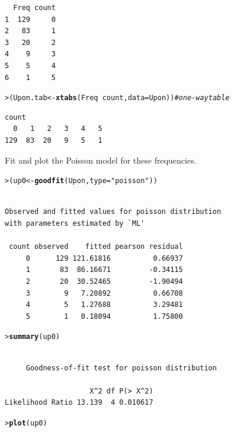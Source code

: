 \documentclass[10pt]{report}\usepackage[]{graphicx}\usepackage[]{color}
\makeatletter
\newcommand{\hlstr}[1]{\textcolor[rgb]{0.192,0.494,0.8}{#1}}%
\newcommand{\hlcom}[1]{\textcolor[rgb]{0.678,0.584,0.686}{\textit{#1}}}%
\newcommand{\hlopt}[1]{\textcolor[rgb]{0,0,0}{#1}}%
\newcommand{\hlstd}[1]{\textcolor[rgb]{0.345,0.345,0.345}{#1}}%
\newcommand{\hlkwb}[1]{\textcolor[rgb]{0.69,0.353,0.396}{#1}}%
\newcommand{\hlkwc}[1]{\textcolor[rgb]{0.333,0.667,0.333}{#1}}%
\newcommand{\hlkwd}[1]{\textcolor[rgb]{0.737,0.353,0.396}{\textbf{#1}}}%
\newenvironment{kframe}{%
 \def\at@end@of@kframe{}%
 \ifinner\ifhmode%
  \def\at@end@of@kframe{\end{minipage}}%
  \begin{minipage}{\columnwidth}%
 \fi\fi%
 \def\FrameCommand##1{\hskip\@totalleftmargin \hskip-\fboxsep
 \colorbox{shadecolor}{##1}\hskip-\fboxsep
     \hskip-\linewidth \hskip-\@totalleftmargin \hskip\columnwidth}%
 \MakeFramed {\advance\hsize-\width
   \@totalleftmargin\z@ \linewidth\hsize
   \@setminipage}}%
 {\par\unskip\endMakeFramed%
 \at@end@of@kframe}
\newenvironment{knitrout}{}{} %
\renewenvironment{knitrout}{\small\renewcommand{\baselinestretch}{.85}}{} %
\makeatother
\begin{document}
\begin{Exercises}
\begin{enumerate*}
\begin{ans}
\begin{knitrout}
\begin{kframe}
\begin{verbatim}
  Freq count
1  129     0
2   83     1
3   20     2
4    9     3
5    5     4
6    1     5
\end{verbatim}
\begin{alltt}
\hlstd{> }\hlstd{(Upon.tab} \hlkwb{<-} \hlkwd{xtabs}\hlstd{(Freq} \hlopt{~} \hlstd{count,} \hlkwc{data}\hlstd{=Upon))}  \hlcom{# one-way table}
\end{alltt}
\begin{verbatim}
count
  0   1   2   3   4   5 
129  83  20   9   5   1 
\end{verbatim}
\end{kframe}
\end{knitrout}
    \end{ans}
    
    \item Fit and plot the Poisson model for these frequencies.
    \begin{ans}
\begin{knitrout}\footnotesize
{}\color{fgcolor}\begin{kframe}
\begin{alltt}
\hlstd{> }\hlstd{(up0} \hlkwb{<-} \hlkwd{goodfit}\hlstd{(Upon,} \hlkwc{type}\hlstd{=}\hlstr{"poisson"}\hlstd{))}
\end{alltt}
\begin{verbatim}

Observed and fitted values for poisson distribution
with parameters estimated by `ML' 

 count observed    fitted pearson residual
     0      129 121.61816          0.66937
     1       83  86.16671         -0.34115
     2       20  30.52465         -1.90494
     3        9   7.20892          0.66708
     4        5   1.27688          3.29481
     5        1   0.18094          1.75800
\end{verbatim}
\begin{alltt}
\hlstd{> }\hlkwd{summary}\hlstd{(up0)}
\end{alltt}
\begin{verbatim}

	 Goodness-of-fit test for poisson distribution

                    X^2 df P(> X^2)
Likelihood Ratio 13.139  4 0.010617
\end{verbatim}
\begin{alltt}
\hlstd{> }\hlkwd{plot}\hlstd{(up0)}
\end{alltt}
\end{kframe}


\end{knitrout}
\end{ans}
\end{enumerate*}
\end{Exercises}
\end{document}
